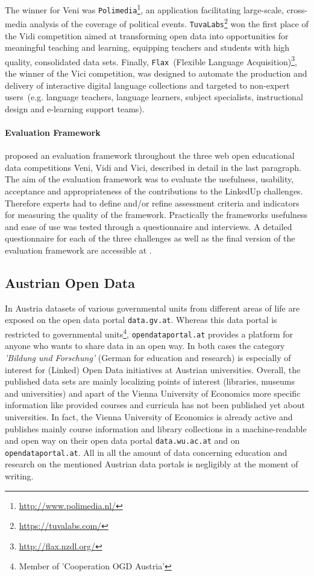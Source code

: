\documentclass{article}
\begin{document}
The winner for Veni was \texttt{Polimedia}\footnote{\url{http://www.polimedia.nl/}}, an application facilitating large-scale, cross-media analysis of the coverage of political events.
\texttt{TuvaLabs}\footnote{\url{https://tuvalabs.com/}} won the first place of the Vidi competition aimed at transforming open data into opportunities for meaningful teaching and learning, equipping teachers and students with high quality, consolidated data sets. Finally, \texttt{Flax}~(Flexible Language Acquisition)\footnote{\url{http://flax.nzdl.org/}},
the winner of the Vici competition, was designed to automate the production and delivery of interactive digital language collections and targeted to non-expert users~(e.g. language teachers, language learners, subject specialists, instructional design and e-learning support teams). 

\paragraph{Evaluation Framework}
\cite{drachsler_final_2014} proposed an evaluation framework throughout the three web open educational data competitions Veni, Vidi and Vici, described in detail in the last paragraph. The aim of the evaluation framework was to evaluate the usefulness, usability, acceptance and appropriateness of the contributions to the LinkedUp challenges. Therefore experts had to define and/or refine assessment criteria and indicators for measuring the quality of the framework. Practically the frameworks usefulness and ease of use was tested through a questionnaire and interviews. A detailed questionnaire for each of the three challenges as well as the final version of the evaluation framework are accessible at \cite{drachsler_final_2014}. 

\subsection{Austrian Open Data}
\label{related-work:austrian-open-data}
In Austria datasets of various governmental units from different areas of life are exposed on the open data portal \texttt{data.gv.at}. Whereas this data portal is restricted to governmental units\footnote{Member of 'Cooperation OGD Austria'}, \texttt{opendataportal.at} provides a platform for anyone who wants to share data in an open way. In both cases the category \textit{'Bildung und Forschung'} (German for education and research) is especially of interest for (Linked) Open Data initiatives at Austrian universities. Overall, the published data sets are mainly localizing points of interest (libraries, museums and universities) and apart of the Vienna University of Economics more specific information like provided courses and curricula has not been published yet about universities. In fact, the Vienna University of Economics is already active and publishes mainly course information and library collections in a machine-readable and open way on their open data portal \texttt{data.wu.ac.at} and on \texttt{opendataportal.at}. All in all the amount of data concerning education and research on the mentioned Austrian data portals is negligibly at the moment of writing.
\end{document}
